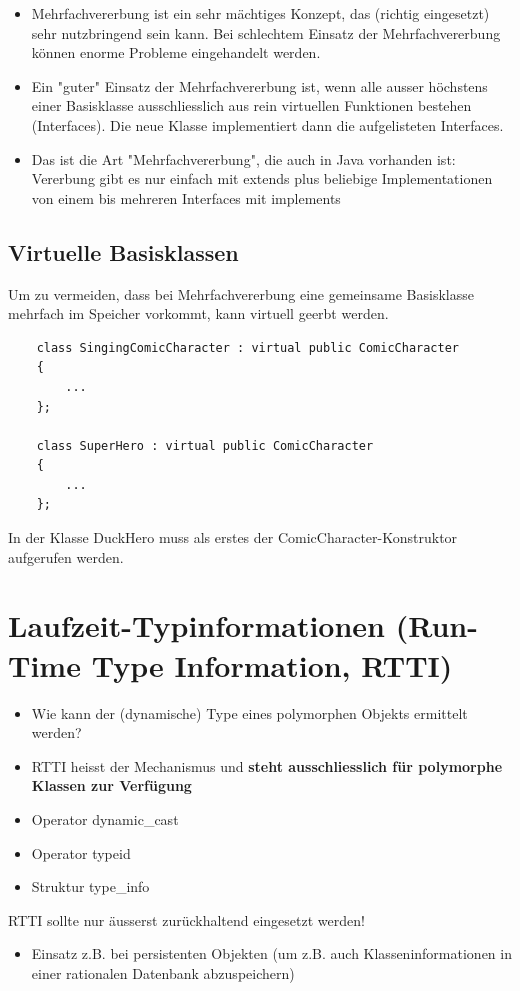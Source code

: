\begin{itemize}
	\item Mehrfachvererbung ist ein sehr mächtiges Konzept, das (richtig eingesetzt) sehr nutzbringend sein kann. Bei schlechtem Einsatz der Mehrfachvererbung können enorme Probleme eingehandelt werden.
	\item Ein "guter" Einsatz der Mehrfachvererbung ist, wenn alle ausser höchstens einer Basisklasse ausschliesslich aus rein virtuellen Funktionen bestehen (Interfaces). Die neue Klasse implementiert dann die aufgelisteten Interfaces.
	\item Das ist die Art "Mehrfachvererbung", die auch in Java vorhanden ist: Vererbung gibt es nur einfach mit extends plus beliebige Implementationen von einem bis mehreren Interfaces mit implements
\end{itemize}

\subsection{Virtuelle Basisklassen}
Um zu vermeiden, dass bei Mehrfachvererbung eine gemeinsame Basisklasse mehrfach im Speicher vorkommt, kann virtuell geerbt werden.
\noindent
\begin{minipage}{\linewidth}
	\begin{lstlisting}
	class SingingComicCharacter : virtual public ComicCharacter
	{
		...
	};
	
	class SuperHero : virtual public ComicCharacter
	{
		...
	};
	\end{lstlisting}
\end{minipage}
In der Klasse DuckHero muss als erstes der ComicCharacter-Konstruktor aufgerufen werden.

\section{Laufzeit-Typinformationen (Run-Time Type Information, RTTI)}
\begin{itemize}
	\item Wie kann der (dynamische) Type eines polymorphen Objekts ermittelt werden?
	\item RTTI heisst der Mechanismus und \textbf{steht ausschliesslich für polymorphe Klassen zur Verfügung}
	\item Operator dynamic\_cast
	\item Operator typeid
	\item Struktur type\_info
\end{itemize}
\begin{achtung}
	RTTI sollte nur äusserst zurückhaltend eingesetzt werden!
\end{achtung}
\begin{itemize}
	\item Einsatz z.B. bei persistenten Objekten (um z.B. auch Klasseninformationen in einer rationalen Datenbank abzuspeichern)
\end{itemize}

